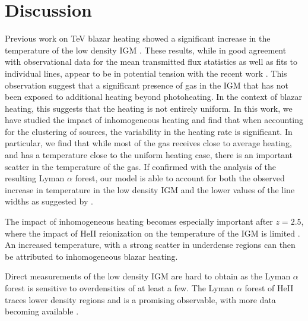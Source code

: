 \documentclass[numberedappendix]{emulateapj}
\begin{document}
\section{Discussion}
Previous work on TeV blazar heating showed a significant increase in the temperature of the low density IGM \citep{2012ApJ...752...23C,2012MNRAS.423..149P}. These results, while in good agreement with observational data for the mean transmitted flux statistics as well as fits to individual lines, appear to be in potential tension with the recent work \citep{2012ApJ...757L..30R}. This observation suggest that a significant presence of gas in the IGM that has not been exposed to additional heating beyond photoheating. In the context of blazar heating, this suggests that the heating is not entirely uniform. In this work, we have studied the impact of inhomogeneous heating and find that when accounting for the clustering of sources, the variability in the heating rate is significant. In particular, we find that while most of the gas receives close to average heating, and has a temperature close to the uniform heating case, there is an important scatter in the temperature of the gas. If confirmed with the analysis of the resulting Lyman $\alpha$ forest, our model is able to account for both the observed increase in temperature in the low density IGM \citep{2014MNRAS.441.1916B,2009MNRAS.399L..39V} and the lower values of the line widths as suggested by \citet{2012ApJ...757L..30R}.

The impact of inhomogeneous heating becomes especially important after $z=2.5$, where the impact of HeII reionization on the temperature of the IGM is limited \citep{2013MNRAS.435.3169C}. An increased temperature, with a strong scatter in underdense regions can then be attributed to inhomogeneous blazar heating. 

Direct measurements of the low density IGM are hard to obtain as the Lyman $\alpha$ forest is sensitive to overdensities of at least a few. The Lyman $\alpha$ forest of HeII traces lower density regions and is a promising observable, with more data becoming available \citep{2014arXiv1405.7405W}.

\end{document}
